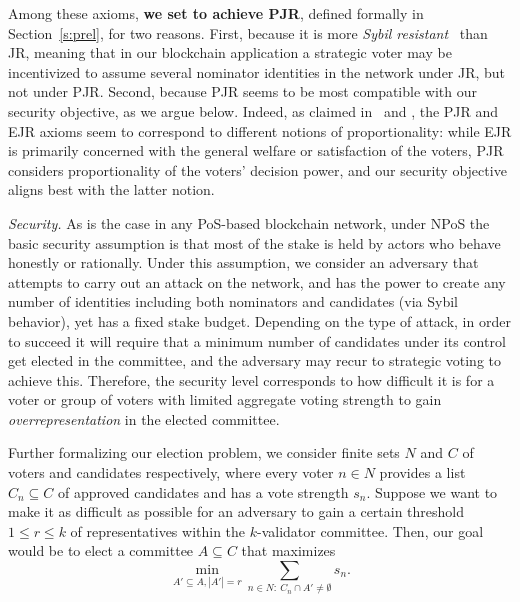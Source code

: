 Among these axioms, \textbf{we set to achieve PJR}, defined formally in Section~\ref{s:prel}, for two reasons. 
First, because it is more \emph{Sybil resistant}~\cite{douceur2002sybil} than JR, meaning that in our blockchain application a strategic voter may be incentivized to assume several nominator identities in the network under JR, but not under PJR. 
Second, because PJR seems to be most compatible with our security objective, as we argue below. Indeed, as claimed in~\cite{peters2019proportionality} and \cite{lackner2020approval}, the PJR and EJR axioms seem to correspond to different notions of proportionality: while EJR is primarily concerned with the general welfare or satisfaction of the voters, PJR considers proportionality of the voters' decision power, and our security objective aligns best with the latter notion.

\emph{Security.} 
As is the case in any PoS-based blockchain network, under NPoS the basic security assumption is that most of the stake is held by actors who behave honestly or rationally. Under this assumption, we consider an adversary that attempts to carry out an attack on the network, and has the power to create any number of identities including both nominators and candidates (via Sybil behavior), yet has a fixed stake budget. Depending on the type of attack, in order to succeed it will require that a minimum number of candidates under its control get elected in the committee, and the adversary may recur to strategic voting to achieve this. Therefore, the security level corresponds to how difficult it is for a voter or group of voters with limited aggregate voting strength to gain \emph{overrepresentation} in the elected committee. 

Further formalizing our election problem, we consider finite sets $N$ and $C$ of voters and candidates respectively, where every voter $n\in N$ provides a list $C_n\subseteq C$ of approved candidates and has a vote strength $s_n$. 
Suppose we want to make it as difficult as possible for an adversary to gain a certain threshold $1\leq r\leq k$ of representatives within the $k$-validator committee. 
Then, our goal would be to elect a committee $A\subseteq C$ that maximizes 
$$\min_{A'\subseteq A, |A'|=r} \sum_{n\in N: \ C_n\cap A'\neq \emptyset} s_n.$$ 

